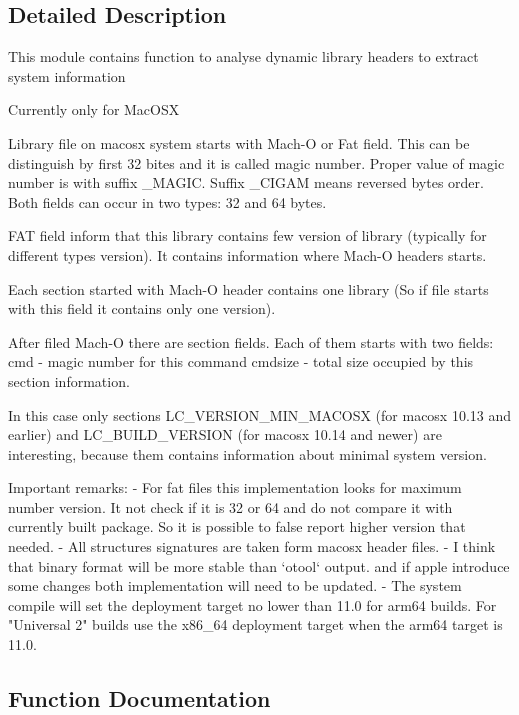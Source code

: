 \subsection{Detailed Description}
\begin{DoxyVerb}This module contains function to analyse dynamic library
headers to extract system information

Currently only for MacOSX

Library file on macosx system starts with Mach-O or Fat field.
This can be distinguish by first 32 bites and it is called magic number.
Proper value of magic number is with suffix _MAGIC. Suffix _CIGAM means
reversed bytes order.
Both fields can occur in two types: 32 and 64 bytes.

FAT field inform that this library contains few version of library
(typically for different types version). It contains
information where Mach-O headers starts.

Each section started with Mach-O header contains one library
(So if file starts with this field it contains only one version).

After filed Mach-O there are section fields.
Each of them starts with two fields:
cmd - magic number for this command
cmdsize - total size occupied by this section information.

In this case only sections LC_VERSION_MIN_MACOSX (for macosx 10.13 and earlier)
and LC_BUILD_VERSION (for macosx 10.14 and newer) are interesting,
because them contains information about minimal system version.

Important remarks:
- For fat files this implementation looks for maximum number version.
  It not check if it is 32 or 64 and do not compare it with currently built package.
  So it is possible to false report higher version that needed.
- All structures signatures are taken form macosx header files.
- I think that binary format will be more stable than `otool` output.
  and if apple introduce some changes both implementation will need to be updated.
- The system compile will set the deployment target no lower than
  11.0 for arm64 builds. For "Universal 2" builds use the x86_64 deployment
  target when the arm64 target is 11.0.
\end{DoxyVerb}
 

\subsection{Function Documentation}
\mbox{\label{namespacewheel_1_1macosx__libfile_af3877aa7396b5d34ed3f151aeb08c6f7}} 
